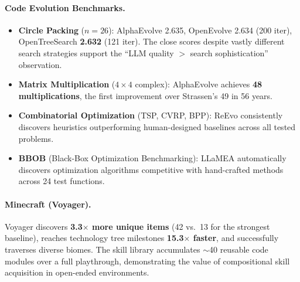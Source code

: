 \paragraph{Code Evolution Benchmarks.}
\begin{itemize}
    \item \textbf{Circle Packing} ($n=26$): AlphaEvolve 2.635, OpenEvolve 2.634 (200 iter), OpenTreeSearch \textbf{2.632} (121 iter). The close scores despite vastly different search strategies support the ``LLM quality $>$ search sophistication'' observation.
    \item \textbf{Matrix Multiplication} ($4\times 4$ complex): AlphaEvolve achieves \textbf{48 multiplications}, the first improvement over Strassen's 49 in 56 years.
    \item \textbf{Combinatorial Optimization} (TSP, CVRP, BPP): ReEvo consistently discovers heuristics outperforming human-designed baselines across all tested problems.
    \item \textbf{BBOB} (Black-Box Optimization Benchmarking): LLaMEA automatically discovers optimization algorithms competitive with hand-crafted methods across 24 test functions.
\end{itemize}

\paragraph{Minecraft (Voyager).}
Voyager discovers \textbf{3.3$\times$ more unique items} (42 vs.\ 13 for the strongest baseline), reaches technology tree milestones \textbf{15.3$\times$ faster}, and successfully traverses diverse biomes. The skill library accumulates $\sim$40 reusable code modules over a full playthrough, demonstrating the value of compositional skill acquisition in open-ended environments.

